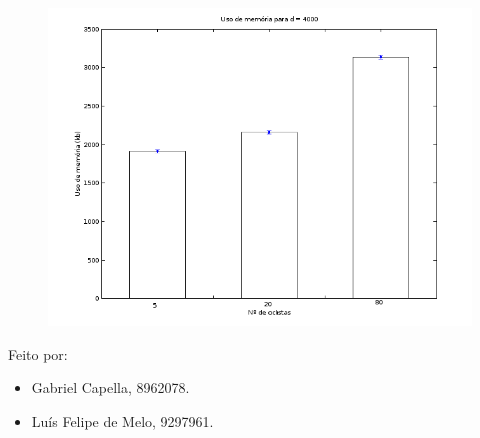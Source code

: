 \documentclass{beamer}
\begin{document}
\begin{frame}
	\begin{figure}[!h]
		\centering
		\includegraphics[scale=0.4]{3.png}
	\end{figure}
\end{frame}

\begin{frame}
	Feito por:
	\begin{itemize}
		\item Gabriel Capella, 8962078.
		\item Luís Felipe de Melo, 9297961.
	\end{itemize}
	
\end{frame}
\end{document}
